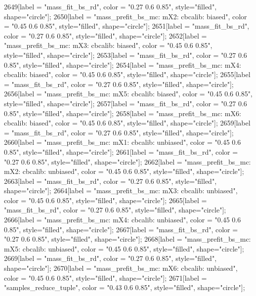 {	2649[label = "mass_fit_bs_rd", color = "0.27 0.6 0.85", style="filled", shape="circle"];
	2650[label = "mass_prefit_bs_mc\nmassbin: mX2\nmassmodel: cbcalib\ntrigger: biased", color = "0.45 0.6 0.85", style="filled", shape="circle"];
	2651[label = "mass_fit_bs_rd", color = "0.27 0.6 0.85", style="filled", shape="circle"];
	2652[label = "mass_prefit_bs_mc\nmassbin: mX3\nmassmodel: cbcalib\ntrigger: biased", color = "0.45 0.6 0.85", style="filled", shape="circle"];
	2653[label = "mass_fit_bs_rd", color = "0.27 0.6 0.85", style="filled", shape="circle"];
	2654[label = "mass_prefit_bs_mc\nmassbin: mX4\nmassmodel: cbcalib\ntrigger: biased", color = "0.45 0.6 0.85", style="filled", shape="circle"];
	2655[label = "mass_fit_bs_rd", color = "0.27 0.6 0.85", style="filled", shape="circle"];
	2656[label = "mass_prefit_bs_mc\nmassbin: mX5\nmassmodel: cbcalib\ntrigger: biased", color = "0.45 0.6 0.85", style="filled", shape="circle"];
	2657[label = "mass_fit_bs_rd", color = "0.27 0.6 0.85", style="filled", shape="circle"];
	2658[label = "mass_prefit_bs_mc\nmassbin: mX6\nmassmodel: cbcalib\ntrigger: biased", color = "0.45 0.6 0.85", style="filled", shape="circle"];
	2659[label = "mass_fit_bs_rd", color = "0.27 0.6 0.85", style="filled", shape="circle"];
	2660[label = "mass_prefit_bs_mc\nmassbin: mX1\nmassmodel: cbcalib\ntrigger: unbiased", color = "0.45 0.6 0.85", style="filled", shape="circle"];
	2661[label = "mass_fit_bs_rd", color = "0.27 0.6 0.85", style="filled", shape="circle"];
	2662[label = "mass_prefit_bs_mc\nmassbin: mX2\nmassmodel: cbcalib\ntrigger: unbiased", color = "0.45 0.6 0.85", style="filled", shape="circle"];
	2663[label = "mass_fit_bs_rd", color = "0.27 0.6 0.85", style="filled", shape="circle"];
	2664[label = "mass_prefit_bs_mc\nmassbin: mX3\nmassmodel: cbcalib\ntrigger: unbiased", color = "0.45 0.6 0.85", style="filled", shape="circle"];
	2665[label = "mass_fit_bs_rd", color = "0.27 0.6 0.85", style="filled", shape="circle"];
	2666[label = "mass_prefit_bs_mc\nmassbin: mX4\nmassmodel: cbcalib\ntrigger: unbiased", color = "0.45 0.6 0.85", style="filled", shape="circle"];
	2667[label = "mass_fit_bs_rd", color = "0.27 0.6 0.85", style="filled", shape="circle"];
	2668[label = "mass_prefit_bs_mc\nmassbin: mX5\nmassmodel: cbcalib\ntrigger: unbiased", color = "0.45 0.6 0.85", style="filled", shape="circle"];
	2669[label = "mass_fit_bs_rd", color = "0.27 0.6 0.85", style="filled", shape="circle"];
	2670[label = "mass_prefit_bs_mc\nmassbin: mX6\nmassmodel: cbcalib\ntrigger: unbiased", color = "0.45 0.6 0.85", style="filled", shape="circle"];
	2671[label = "samples_reduce_tuple", color = "0.43 0.6 0.85", style="filled", shape="circle"];
}
